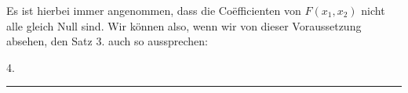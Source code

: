 Es ist hierbei immer angenommen, dass die Co\"efficienten
von $F(x_1, x_2)$ nicht alle gleich Null sind. Wir k\"onnen also,
wenn wir von dieser Voraussetzung absehen, den Satz 3. auch
so aussprechen:

4.\ 

\rule{4cm}{0.4pt}
